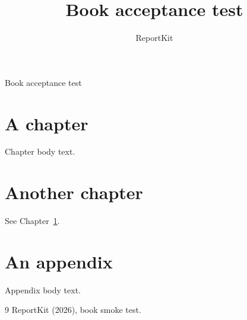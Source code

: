 \documentclass[theme=default,publication-type=book]{reportkit}
\title{Book acceptance test}
\author{ReportKit}
\date{}
\begin{document}
\RKFrontMatterBegin
{}

\begin{bookdetails}{Book acceptance test}
\end{bookdetails}

\RKContents
\RKMainMatterBegin


\section{A chapter}
\label{ch:one}
Chapter body text.

\section{Another chapter}
See Chapter~\ref{ch:one}.

\bookappendix

\section{An appendix}
Appendix body text.

\begin{bookglossary}
\end{bookglossary}

\begin{bookreferences}{9}
 ReportKit (2026), book smoke test.
\end{bookreferences}
\end{document}

